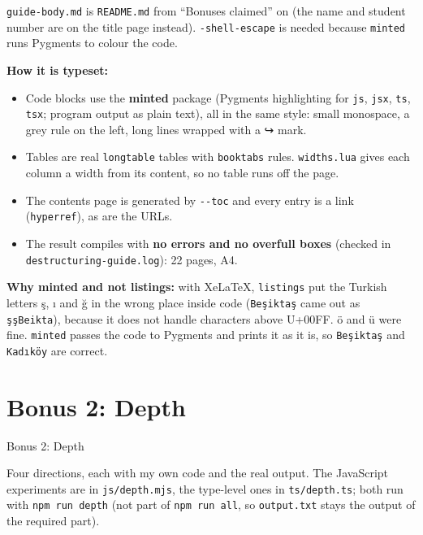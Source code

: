\documentclass[
  10pt,
]{article}
\providecommand{\tightlist}{%
  \setlength{\itemsep}{0pt}\setlength{\parskip}{0pt}}
\begin{document}
\texttt{guide-body.\allowbreak{}md} is \texttt{README.\allowbreak{}md}
from ``Bonuses claimed'' on (the name and student number are on the
title page instead). \texttt{-shell-escape} is needed because
\texttt{minted} runs Pygments to colour the code.

\textbf{How it is typeset:}

\begin{itemize}
\tightlist
\item
  Code blocks use the \textbf{minted} package (Pygments highlighting for
  \texttt{js}, \texttt{jsx}, \texttt{ts}, \texttt{tsx}; program output
  as plain text), all in the same style: small monospace, a grey rule on
  the left, long lines wrapped with a ↪ mark.
\item
  Tables are real \texttt{longtable} tables with \texttt{booktabs}
  rules. \texttt{widths.\allowbreak{}lua} gives each column a width from
  its content, so no table runs off the page.
\item
  The contents page is generated by \texttt{-\/\allowbreak{}-toc} and
  every entry is a link (\texttt{hyperref}), as are the URLs.
\item
  The result compiles with \textbf{no errors and no overfull boxes}
  (checked in \texttt{destructuring-guide.\allowbreak{}log}): 22 pages,
  A4.
\end{itemize}

\textbf{Why minted and not listings:} with XeLaTeX, \texttt{listings}
put the Turkish letters ş, ı and ğ in the wrong place inside code
(\texttt{\allowbreak{}\textquotesingle{}Beşiktaş\allowbreak{}\textquotesingle{}}
came out as
\texttt{\allowbreak{}\textquotesingle{}şşBeikta\allowbreak{}\textquotesingle{}}),
because it does not handle characters above U+00FF. ö and ü were fine.
\texttt{minted} passes the code to Pygments and prints it as it is, so
\texttt{\allowbreak{}\textquotesingle{}Beşiktaş\allowbreak{}\textquotesingle{}}
and
\texttt{\allowbreak{}\textquotesingle{}Kadıköy\allowbreak{}\textquotesingle{}}
are correct.

\hypertarget{bonus-2-depth}{%
\section{Bonus 2: Depth}\label{bonus-2-depth}}

Bonus 2: Depth

Four directions, each with my own code and the real output. The
JavaScript experiments are in
\texttt{js/\allowbreak{}depth.\allowbreak{}mjs}, the type-level ones in
\texttt{ts/\allowbreak{}depth.\allowbreak{}ts}; both run with
\texttt{npm\ run\ depth} (not part of \texttt{npm\ run\ all}, so
\texttt{output.\allowbreak{}txt} stays the output of the required part).
\end{document}

